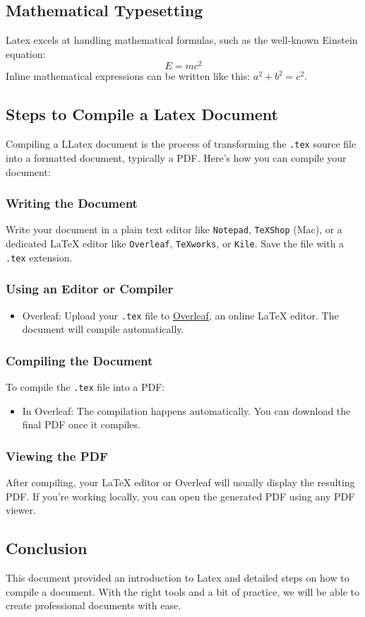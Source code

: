 \subsection{Mathematical Typesetting}
Latex{} excels at handling mathematical formulas, such as the well-known Einstein equation:
\begin{equation}
    E = mc^2
\end{equation}
Inline mathematical expressions can be written like this: \( a^2 + b^2 = c^2 \).

\subsection{Steps to Compile a Latex{} Document}
Compiling a LLatex{} document is the process of transforming the \texttt{.tex} source file into a formatted document, typically a PDF. Here's how you can compile your document:

\subsubsection{Writing the Document}
Write your document in a plain text editor like \texttt{Notepad}, \texttt{TeXShop} (Mac), or a dedicated LaTeX editor like \texttt{Overleaf}, \texttt{TeXworks}, or \texttt{Kile}. Save the file with a \texttt{.tex} extension.

\subsubsection{Using an Editor or Compiler}
\begin{itemize}
    \item Overleaf: Upload your \texttt{.tex} file to \href{https://www.overleaf.com}{Overleaf}, an online LaTeX editor. The document will compile automatically.
\end{itemize}

\subsubsection{Compiling the Document}
To compile the \texttt{.tex} file into a PDF:
\begin{itemize}
    \item In Overleaf: The compilation happens automatically. You can download the final PDF once it compiles.
\end{itemize}

\subsubsection{Viewing the PDF}
After compiling, your LaTeX editor or Overleaf will usually display the resulting PDF. If you're working locally, you can open the generated PDF using any PDF viewer.

\subsection{Conclusion}
This document provided an introduction to Latex and detailed steps on how to compile a document. With the right tools and a bit of practice, we will be able to create professional documents with ease.

